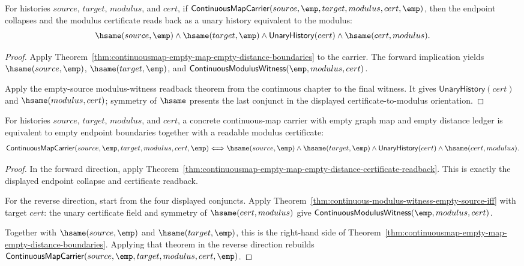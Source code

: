 \begin{theorem}
\label{thm:continuousmap-empty-map-empty-distance-certificate-readback}
For histories $source$, $target$, $modulus$, and $cert$, if
$\mathsf{ContinuousMapCarrier}(source,\emp,target,modulus,cert,\emp)$, then
the endpoint collapses and the modulus certificate reads back as a unary
history equivalent to the modulus:
$$
\hsame(source,\emp)\land\hsame(target,\emp)\land
\mathsf{UnaryHistory}(cert)\land\hsame(cert,modulus).
$$
\end{theorem}
\begin{proof}
Apply Theorem~\ref{thm:continuousmap-empty-map-empty-distance-boundaries} to
the carrier. The forward implication yields $\hsame(source,\emp)$,
$\hsame(target,\emp)$, and
$\mathsf{ContinuousModulusWitness}(\emp,modulus,cert)$.

Apply the empty-source modulus-witness readback theorem from the continuous
chapter to the final witness. It gives $\mathsf{UnaryHistory}(cert)$ and
$\hsame(modulus,cert)$; symmetry of $\hsame$ presents the last conjunct in the
displayed certificate-to-modulus orientation.
\end{proof}

\begin{theorem}
\label{thm:continuousmap-empty-map-empty-distance-certificate-exactness}
For histories $source$, $target$, $modulus$, and $cert$, a concrete
continuous-map carrier with empty graph map and empty distance ledger is
equivalent to empty endpoint boundaries together with a readable modulus
certificate:
$$
\mathsf{ContinuousMapCarrier}(source,\emp,target,modulus,cert,\emp)
\Longleftrightarrow
\hsame(source,\emp)\land\hsame(target,\emp)\land
\mathsf{UnaryHistory}(cert)\land\hsame(cert,modulus).
$$
\end{theorem}
\begin{proof}
In the forward direction, apply
Theorem~\ref{thm:continuousmap-empty-map-empty-distance-certificate-readback}.
This is exactly the displayed endpoint collapse and certificate readback.

For the reverse direction, start from the four displayed conjuncts. Apply
Theorem~\ref{thm:continuous-modulus-witness-empty-source-iff} with target
$cert$: the unary certificate field and symmetry of $\hsame(cert,modulus)$ give
$\mathsf{ContinuousModulusWitness}(\emp,modulus,cert)$.

Together with $\hsame(source,\emp)$ and $\hsame(target,\emp)$, this is the
right-hand side of
Theorem~\ref{thm:continuousmap-empty-map-empty-distance-boundaries}. Applying
that theorem in the reverse direction rebuilds
$\mathsf{ContinuousMapCarrier}(source,\emp,target,modulus,cert,\emp)$.
\end{proof}

